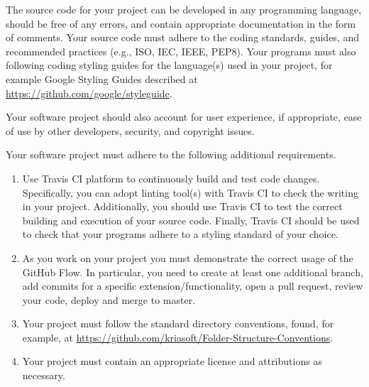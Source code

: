 \documentclass[11pt]{article}
\begin{document}
The source code for your project can be developed in any programming language, should be free of any errors, and contain appropriate documentation in the form of comments. Your source code must adhere to the coding standards, guides, and recommended practices (e.g., ISO, IEC, IEEE, PEP8). Your programs must also following coding styling guides for the language(s) used in your project, for example Google Styling Guides described at \url{https://github.com/google/styleguide}. 

Your software project should also account for user experience, if appropriate, ease of use by other developers, security, and copyright issues.

Your software project must adhere to the following additional requirements.
\begin{enumerate}
	\item Use Travis CI platform to continuously build and test code changes. Specifically, you can adopt linting tool(s) with Travis CI to check the writing in your project. Additionally, you should use Travis CI to test the correct building and execution of your source code. Finally, Travis CI should be used to check that your programs adhere to a styling standard of your choice. 
	\item As you work on your project you must demonstrate the correct usage of the GitHub Flow. In particular, you need to create at least one additional branch, add commits for a specific extension/functionality, open a pull request, review your code, deploy and merge to master.
	\item Your project must follow the standard directory conventions, found, for example, at \url{https://github.com/kriasoft/Folder-Structure-Conventions}.
	\item Your project must contain an appropriate license and attributions as necessary.
\end{enumerate} 
\end{document}
